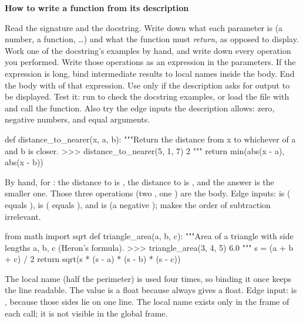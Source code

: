 \documentclass[10pt]{scrartcl}
\newenvironment{howto}[1]{\begin{mdframed}[style=howtostyle]{\color{NavyBlue}\textbf{#1}}\par\vspace{2pt}}{\end{mdframed}}
\begin{document}
\begin{howto}{How to write a function from its description}
\begin{steps}
  \ii Read the signature and the docstring. Write down what each parameter is (a number, a function, \dots) and what the function must \emph{return}, as opposed to display.
  \ii Work one of the docstring's examples by hand, and write down every operation you performed.
  \ii Write those operations as an expression in the parameters. If the expression is long, bind intermediate results to local names inside the body.
  \ii End the body with  of that expression. Use  only if the description asks for output to be displayed.
  \ii Test it: run  to check the docstring examples, or load the file with \mbox{} and call the function. Also try the edge inputs the description allows: zero, negative numbers, and equal arguments.
\end{steps}
\end{howto}

\begin{example*}
\begin{py}
def distance_to_nearer(x, a, b):
    """Return the distance from x to whichever of a and b is closer.
    >>> distance_to_nearer(5, 1, 7)
    2
    """
    return min(abs(x - a), abs(x - b))
\end{py}
By hand, for : the distance to  is , the distance to  is , and the answer is the smaller one. Those three operations (two , one ) are the body. Edge inputs:  is  ( equals ),  is  ( equals ), and  is  (a negative );  makes the order of subtraction irrelevant.
\end{example*}

\begin{example*}
\begin{py}
from math import sqrt
def triangle_area(a, b, c):
    """Area of a triangle with side lengths a, b, c (Heron's formula).
    >>> triangle_area(3, 4, 5)
    6.0
    """
    s = (a + b + c) / 2
    return sqrt(s * (s - a) * (s - b) * (s - c))
\end{py}
The local name  (half the perimeter) is used four times, so binding it once keeps the  line readable. The value is a float because \cd{/} always gives a float. Edge input:  is , because those sides lie on one line. The local name  exists only in the frame of each call; it is not visible in the global frame.
\end{example*}
\end{document}
